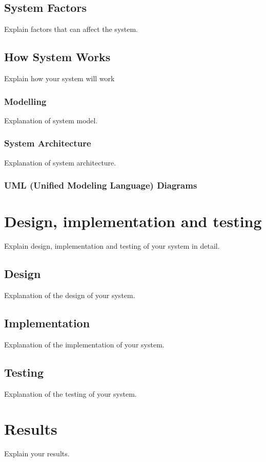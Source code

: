 \documentclass{mefsdp}
\begin{document}
	\subsection{System Factors}
	Explain factors that can affect the system.
	
	\subsection{How System Works}
	Explain how your system will work
	
	\subsubsection{Modelling}
	Explanation of system model.
	
	\subsubsection{System Architecture }
	Explanation of system architecture.
	
	\subsubsection{UML (Unified Modeling Language) Diagrams}
	
	\section{Design, implementation and testing}
	Explain design, implementation and testing of your system in detail.
	
	\subsection{Design}
	Explanation of the design of your system.
	
	\subsection{Implementation}
	Explanation of the implementation of your system.
	
	\subsection{Testing}
	Explanation of the testing of your system.
	
	\section{Results}
	Explain your results.
	
\end{document}
